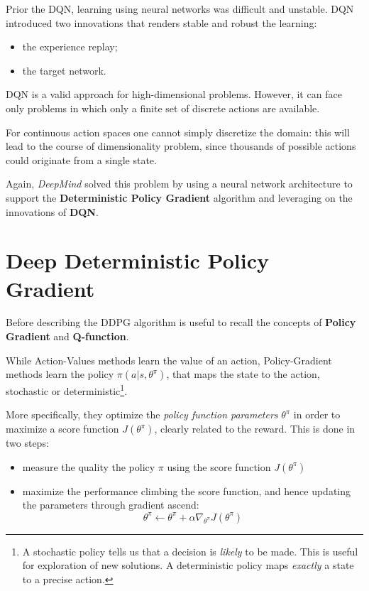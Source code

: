 \documentclass[10pt,a4paper]{scrartcl}
\begin{document}
Prior the DQN, learning using neural networks was difficult and unstable. DQN introduced two innovations that renders stable and robust the learning:
\begin{itemize}
	\item the experience replay;
	\item the target network.
\end{itemize} 

DQN is a valid approach for high-dimensional problems. However, it can face only problems in which only a finite set of discrete actions are available. 

For continuous action spaces one cannot simply discretize the domain: this will lead to the course of dimensionality problem, since thousands of possible actions could originate from a single state. 

Again, \textit{DeepMind} solved this problem by using a neural network architecture to support the \textbf{Deterministic Policy Gradient} algorithm and leveraging on the innovations of \textbf{DQN}.


\section{Deep Deterministic Policy Gradient}

Before describing the DDPG algorithm is useful to recall the concepts of \textbf{Policy Gradient} and \textbf{Q-function}.

While Action-Values methods learn the value of an action, Policy-Gradient methods learn the policy $ \pi(a|s,\theta^\pi) $, that maps the state to the action, stochastic or deterministic\footnote{A stochastic policy tells us that a decision is \textit{likely} to be made. This is useful for exploration of new solutions. A deterministic policy maps \textit{exactly} a state to a precise action.}. 

More specifically, they optimize the \textit{policy function parameters} $ \theta^\pi $ in order to maximize a score function $ J(\theta^\pi) $, clearly related to the reward. This is done in two steps:
\begin{itemize}
	\item measure the quality the policy $ \pi $ using the score function $ J(\theta^\pi) $
	\item maximize the performance climbing the score function, and hence updating the parameters through gradient ascend: \begin{equation}
		\theta^\pi \leftarrow \theta^\pi +  \alpha \nabla_{\theta^\pi}J(\theta^\pi) \label{update_step}
	\end{equation}
\end{itemize}
\end{document}
